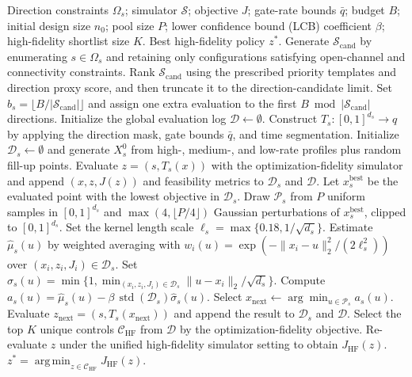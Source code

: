 \documentclass[lettersize,journal]{IEEEtran}
\begin{document}
\begin{algorithm}[!t]
\caption{HCMBO for Joint Direction and Entrance-Rate Control}
\label{alg:hcmbo}
\small
\raggedright
\begin{algorithmic}[1]
\REQUIRE Direction constraints $\Omega_s$; simulator $\mathcal S$; objective $J$; gate-rate bounds $\bar q$; budget $B$; initial design size $n_0$; pool size $P$; lower confidence bound (LCB) coefficient $\beta$; high-fidelity shortlist size $K$.
\ENSURE Best high-fidelity policy $z^*$.
\STATE Generate $\mathcal S_{\mathrm{cand}}$ by enumerating $s\in\Omega_s$ and retaining only configurations satisfying open-channel and connectivity constraints.
\STATE Rank $\mathcal S_{\mathrm{cand}}$ using the prescribed priority templates and direction proxy score, and then truncate it to the direction-candidate limit.
\STATE Set $b_s=\lfloor B/|\mathcal S_{\mathrm{cand}}|\rfloor$ and assign one extra evaluation to the first $B\bmod|\mathcal S_{\mathrm{cand}}|$ directions.
\STATE Initialize the global evaluation log $\mathcal D\leftarrow\emptyset$.
\STATE Construct $T_s:[0,1]^{d_s}\rightarrow q$ by applying the direction mask, gate bounds $\bar q$, and time segmentation.
\STATE Initialize $\mathcal D_s\leftarrow\emptyset$ and generate $X_s^{0}$ from high-, medium-, and low-rate profiles plus random fill-up points.
\STATE Evaluate $z=(s,T_s(x))$ with the optimization-fidelity simulator and append $(x,z,J(z))$ and feasibility metrics to $\mathcal D_s$ and $\mathcal D$.
\ENDIF
\ENDFOR
{}
\STATE Let $x_s^{\mathrm{best}}$ be the evaluated point with the lowest objective in $\mathcal D_s$.
\STATE Draw $\mathcal P_s$ from $P$ uniform samples in $[0,1]^{d_s}$ and $\max(4,\lfloor P/4\rfloor)$ Gaussian perturbations of $x_s^{\mathrm{best}}$, clipped to $[0,1]^{d_s}$.
\STATE Set the kernel length scale $\ell_s=\max\{0.18,1/\sqrt{d_s}\}$.
\STATE Estimate $\hat\mu_s(u)$ by weighted averaging with $w_i(u)=\exp(-\|x_i-u\|_2^2/(2\ell_s^2))$ over $(x_i,z_i,J_i)\in\mathcal D_s$.
\STATE Set $\hat\sigma_s(u)=\min\{1,\min_{(x_i,z_i,J_i)\in\mathcal D_s}\|u-x_i\|_2/\sqrt{d_s}\}$.
\STATE Compute $a_s(u)=\hat\mu_s(u)-\beta\,\operatorname{std}(\mathcal D_s)\hat\sigma_s(u)$.
\ENDFOR
\STATE Select $x_{\mathrm{next}}\leftarrow\arg\min_{u\in\mathcal P_s}a_s(u)$.
\STATE Evaluate $z_{\mathrm{next}}=(s,T_s(x_{\mathrm{next}}))$ and append the result to $\mathcal D_s$ and $\mathcal D$.
\ENDWHILE
\ENDFOR
\STATE Select the top $K$ unique controls $\mathcal C_{\mathrm{HF}}$ from $\mathcal D$ by the optimization-fidelity objective.
\STATE Re-evaluate $z$ under the unified high-fidelity simulator setting to obtain $J_{\mathrm{HF}}(z)$.
\ENDFOR
\RETURN $z^*=\operatorname*{arg\,min}_{z\in\mathcal C_{\mathrm{HF}}}J_{\mathrm{HF}}(z)$.
\end{algorithmic}
\end{algorithm}
\end{document}
